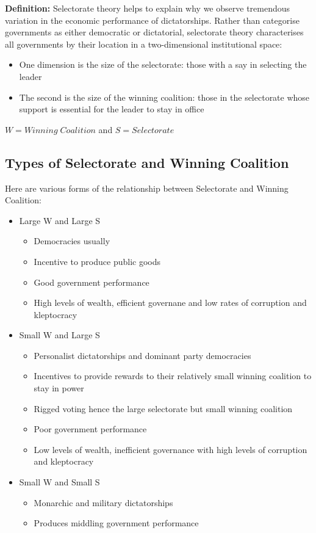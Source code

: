 \documentclass[12pt, letterpaper]{article}
\begin{document}
\textbf{Definition:} Selectorate theory helps to explain why we observe tremendous variation in the economic performance of dictatorships. Rather than categorise governments as either democratic or dictatorial, selectorate theory characterises all governments by their location in a two-dimensional institutional space:
\begin{itemize}
	\item One dimension is the size of the selectorate: those with a say in selecting the leader
	\item The second is the size of the winning coalition: those in the selectorate whose support is essential for the leader to stay in office
\end{itemize}

\begin{center}
	$W = Winning\;Coalition$ and $S = Selectorate$
\end{center}

\subsection{Types of Selectorate and Winning Coalition}
Here are various forms of the relationship between Selectorate and Winning Coalition:
\begin{itemize}
	\item Large W and Large S
		\begin{itemize}
			\item Democracies usually
			\item Incentive to produce public goods
			\item Good government performance
			\item High levels of wealth, efficient governane and low rates of corruption and kleptocracy
		\end{itemize}
	\item Small W and Large S
		\begin{itemize}
			\item Personalist dictatorships and dominant party democracies
			\item Incentives to provide rewards to their relatively small winning coalition to stay in power
			\item Rigged voting hence the large selectorate but small winning coalition
			\item Poor government performance
			\item Low levels of wealth, inefficient governance with high levels of corruption and kleptocracy
		\end{itemize}
	\item Small W and Small S
		\begin{itemize}
			\item Monarchic and military dictatorships
			\item Produces middling government performance
		\end{itemize}
\end{itemize}
\end{document}
